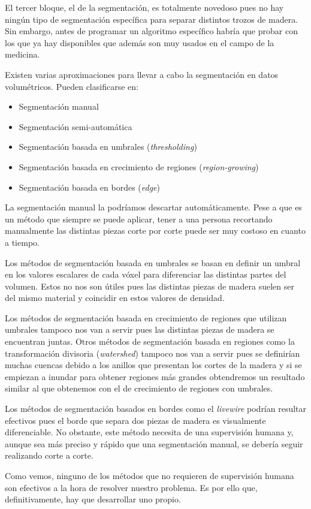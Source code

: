 El tercer bloque, el de la segmentación, es totalmente novedoso pues no hay ningún tipo de segmentación específica para separar distintos trozos de madera. Sin embargo, antes de programar un algoritmo específico habría que probar con los que ya hay disponibles que además son muy usados en el campo de la medicina.

Existen varias aproximaciones para llevar a cabo la segmentación en datos volumétricos. Pueden clasificarse en:

\begin{itemize}
	\item Segmentación manual
	\item Segmentación semi-automática
	\item Segmentación basada en umbrales (\textit{thresholding})
	\item Segmentación basada en crecimiento de regiones (\textit{region-growing})
	\item Segmentación basada en bordes (\textit{edge})
\end{itemize}

La segmentación manual la podríamos descartar automáticamente. Pese a que es un método que siempre se puede aplicar, tener a una persona recortando manualmente las distintas piezas corte por corte puede ser muy costoso en cuanto a tiempo.

Los métodos de segmentación basada en umbrales \cite{otsu79} se basan en definir un umbral en los valores escalares de cada vóxel para diferenciar las distintas partes del volumen. Estos no nos son útiles pues las distintas piezas de madera suelen ser del mismo material y coincidir en estos valores de densidad.

Los métodos de segmentación basada en crecimiento de regiones que utilizan umbrales \cite{haralick85} tampoco nos van a servir pues las distintas piezas de madera se encuentran juntas. Otros métodos de segmentación basada en regiones como la transformación divisoria (\textit{watershed}) \cite{beucher79} tampoco nos van a servir pues se definirían muchas cuencas debido a los anillos que presentan los cortes de la madera y si se empiezan a inundar para obtener regiones más grandes obtendremos un resultado similar al que obtenemos con el de crecimiento de regiones con umbrales.

Los métodos de segmentación basados en bordes como el \textit{livewire} \cite{mortensen95} podrían resultar efectivos pues el borde que separa dos piezas de madera es visualmente diferenciable. No obstante, este método necesita de una supervisión humana y, aunque sea más preciso y rápido que una segmentación manual, se debería seguir realizando corte a corte.

Como vemos, ninguno de los métodos que no requieren de supervisión humana son efectivos a la hora de resolver nuestro problema. Es por ello que, definitivamente, hay que desarrollar uno propio.